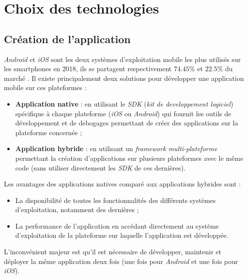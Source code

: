 \section{Choix des technologies}

\subsection{Création de l'application}

\textit{Android} et \textit{iOS} sont les deux systèmes d'exploitation mobile les plus utilisés sur les smartphones en 2018, ils se partagent respectivement $74.45\%$ et $22.5\%$ du marché \cite{market_share}. Il existe principalement deux solutions pour développer une application mobile sur ces plateformes :

\begin{itemize}
  \item \textbf{Application native} : en utilisant le \textit{SDK} (\textit{kit de developpement logiciel}) spécifique à chaque plateforme (\textit{iOS} ou \textit{Android}) qui fournit les outils de développement et de debogages permettant de créer des applications sur la plateforme concernée ;
  \item \textbf{Application hybride} : en utilisant un \textit{framework multi-plateforme} permettant la création d'applications sur plusieurs plateformes avec le même code (sans utiliser directement les \textit{SDK} de ces dernières).
\end{itemize}

Les avantages des applications natives comparé aux applications hybrides sont :

\begin{itemize}
  \item La disponibilité de toutes les fonctionnalités des différents systèmes d'exploitation, notamment des dernières ;
  \item La performance de l'application en accédant directement au système d'exploitation de la plateforme sur laquelle l'application est développée.
\end{itemize}

L'inconvénient majeur est qu'il est nécessaire de développer, maintenir et déployer la même application deux fois (une fois pour \textit{Android} et une fois pour \textit{iOS}).


